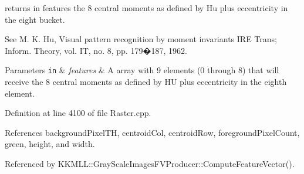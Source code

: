 returns in \textquotesingle{}features\textquotesingle{} the 8 central moments as defined by Hu plus eccentricity in the eight bucket. 

See M. K. Hu, Visual pattern recognition by moment invariants I\+RE Trans; Inform. Theory, vol. IT, no. 8, pp. 179�187, 1962. 
\begin{DoxyParams}[1]{Parameters}
\mbox{\tt in}  & {\em features} & A array with 9 elements (0 through 8) that will receive the 8 central moments as defined by HU plus eccentricity in the eighth element. \\
\hline
\end{DoxyParams}


Definition at line 4100 of file Raster.\+cpp.



References background\+Pixel\+TH, centroid\+Col, centroid\+Row, foreground\+Pixel\+Count, green, height, and width.



Referenced by K\+K\+M\+L\+L\+::\+Gray\+Scale\+Images\+F\+V\+Producer\+::\+Compute\+Feature\+Vector().



